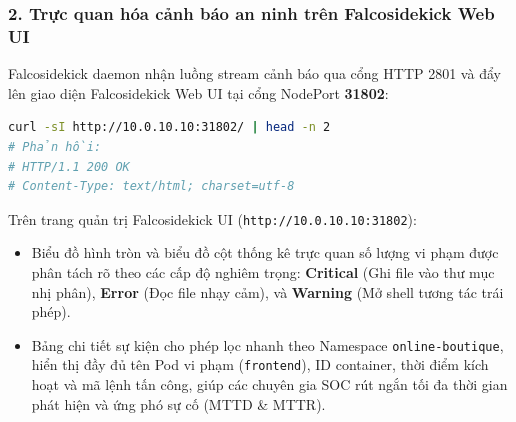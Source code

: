 \subsubsection{2. Trực quan hóa cảnh báo an ninh trên Falcosidekick Web UI}
Falcosidekick daemon nhận luồng stream cảnh báo qua cổng HTTP 2801 và đẩy lên giao diện Falcosidekick Web UI tại cổng NodePort \textbf{31802}:
\begin{lstlisting}[language=bash, caption={Kiểm tra trạng thái sẵn sàng của giao diện Falcosidekick Web UI}]
curl -sI http://10.0.10.10:31802/ | head -n 2
# Phản hồi:
# HTTP/1.1 200 OK
# Content-Type: text/html; charset=utf-8
\end{lstlisting}
Trên trang quản trị Falcosidekick UI (\texttt{http://10.0.10.10:31802}):
\begin{itemize}
    \item Biểu đồ hình tròn và biểu đồ cột thống kê trực quan số lượng vi phạm được phân tách rõ theo các cấp độ nghiêm trọng: \textbf{Critical} (Ghi file vào thư mục nhị phân), \textbf{Error} (Đọc file nhạy cảm), và \textbf{Warning} (Mở shell tương tác trái phép).
    \item Bảng chi tiết sự kiện cho phép lọc nhanh theo Namespace \texttt{online-boutique}, hiển thị đầy đủ tên Pod vi phạm (\texttt{frontend}), ID container, thời điểm kích hoạt và mã lệnh tấn công, giúp các chuyên gia SOC rút ngắn tối đa thời gian phát hiện và ứng phó sự cố (MTTD \& MTTR).
\end{itemize}


